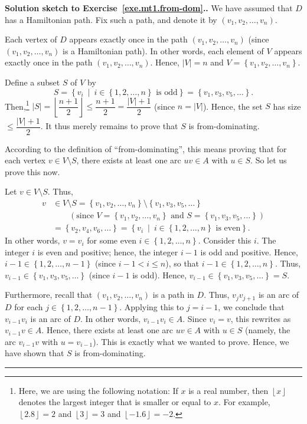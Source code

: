 \documentclass[numbers=enddot,12pt,final,onecolumn,notitlepage]{scrartcl}%
\theoremstyle{definition}
\newenvironment{proof}[1][Proof]{\noindent\textbf{#1.} }{\ \rule{0.5em}{0.5em}}
\newcommand{\set}[1]{\left\{ #1 \right\}}
\newcommand{\abs}[1]{\left| #1 \right|}
\newcommand{\tup}[1]{\left( #1 \right)}
\newcommand{\floor}[1]{\left\lfloor #1 \right\rfloor}
\begin{document}
\begin{proof}[Solution sketch to Exercise~\ref{exe.mt1.from-dom}.]
We have assumed that $D$ has a Hamiltonian path. Fix such a path, and
denote it by $\tup{v_1, v_2, \ldots, v_n}$.

Each vertex of $D$ appears exactly once in the path
$\tup{v_1, v_2, \ldots, v_n}$ (since $\tup{v_1, v_2, \ldots, v_n}$ is
a Hamiltonian path). In other words, each element of $V$ appears
exactly once in the path $\tup{v_1, v_2, \ldots, v_n}$. Hence,
$\abs{V} = n$ and $V = \set{v_1, v_2, \ldots, v_n}$.

Define a subset $S$ of $V$ by
\[
S = \set{v_i \ \mid \  i \in \set{1,2,\ldots,n} \text{ is odd}}
  = \set{v_1, v_3, v_5, \ldots}.
\]
Then,\footnote{Here, we are using the following notation: If $x$ is a
real number, then $\floor{x}$ denotes the largest integer that is
smaller or equal to $x$. For example, $\floor{2.8} = 2$ and
$\floor{3} = 3$ and $\floor{-1.6} = -2$.}
$\abs{S} = \floor{\dfrac{n+1}{2}} \leq \dfrac{n+1}{2}
= \dfrac{\abs{V}+1}{2}$ (since $n = \abs{V}$). Hence, the set $S$ has
size $\leq \dfrac{\abs{V}+1}{2}$. It thus merely remains to prove that
$S$ is from-dominating.

According to the definition of ``from-dominating'', this means proving
that for each vertex $v \in V \setminus S$, there exists at least one
arc $uv \in A$ with $u \in S$. So let us prove this now.

Let $v \in V \setminus S$. Thus,
\begin{align*}
v &\in V \setminus S
= \set{v_1, v_2, \ldots, v_n} \setminus
     \set{v_1, v_3, v_5, \ldots} \\
&\qquad
\left( \text{since } V = \set{v_1, v_2, \ldots, v_n} \text{ and }
        S = \set{v_1, v_3, v_5, \ldots} \right) \\
&= \set{v_2, v_4, v_6, \ldots}
= \set{v_i \ \mid \  i \in \set{1,2,\ldots,n} \text{ is even}} .
\end{align*}
In other words, $v = v_i$ for some even $i \in \set{1,2,\ldots,n}$.
Consider this $i$. The integer $i$ is even and positive; hence, the
integer $i-1$ is odd and positive. Hence,
$i-1 \in \set{1,2,\ldots,n-1}$ (since $i-1 < i \leq n$), so that
$i-1 \in \set{1, 2, \ldots, n}$.
Thus, $v_{i-1} \in \set{v_1, v_3, v_5, \ldots}$ (since $i-1$ is odd).
Hence, $v_{i-1} \in \set{v_1, v_3, v_5, \ldots} = S$.

Furthermore, recall that $\tup{v_1, v_2, \ldots, v_n}$ is a path in
$D$. Thus, $v_j v_{j+1}$ is an arc of $D$ for each
$j \in \set{1,2,\ldots,n-1}$. Applying this to $j=i-1$, we conclude
that $v_{i-1} v_i$ is an arc of $D$. In other words,
$v_{i-1} v_i \in A$. Since $v_i = v$, this rewrites as
$v_{i-1} v \in A$. Hence, there exists at least one arc $uv \in A$
with $u \in S$ (namely, the arc $v_{i-1} v$ with $u = v_{i-1}$).
This is exactly what we wanted to prove. Hence, we have shown that $S$
is from-dominating.
\end{proof}
\end{document}

